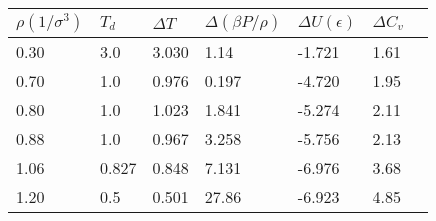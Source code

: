 \begin{center}
\begin{tabular}{lllllll}
\hline \hline
$\rho(1/\sigma^3)$ & $T_d$ & $\Delta T$ & $\Delta (\beta P/\rho)$ & $\Delta U(\epsilon)$ & $\Delta C_v$ \\
\hline
0.30 & 3.0 & 3.030 & 1.14 & -1.721 & 1.61\\
0.70 & 1.0 & 0.976 & 0.197 & -4.720 & 1.95\\
0.80 & 1.0 & 1.023 & 1.841 & -5.274 & 2.11\\
0.88& 1.0 & 0.967 & 3.258 & -5.756 & 2.13\\
1.06& 0.827&0.848 & 7.131 & -6.976 & 3.68\\
1.20 & 0.5 & 0.501 & 27.86 & -6.923 & 4.85\\
\hline \hline
\end{tabular}
\vspace{-0.1cm}
\label{table:variance}
\end{center}

